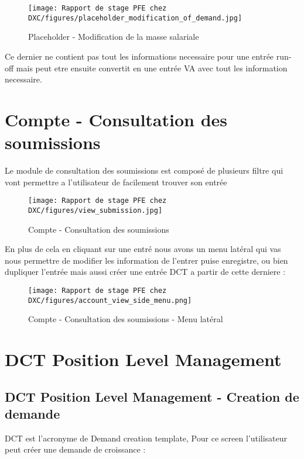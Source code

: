 \begin{figure}[H]
    \centering
    \texttt{[image: Rapport de stage PFE chez DXC/figures/placeholder\_modification\_of\_demand.jpg]}
    \caption{Placeholder - Modification de la masse salariale}
\end{figure}

Ce dernier ne contient pas tout les informations necessaire pour une entrée run-off mais peut etre ensuite convertit en une entrée VA avec tout les information necessaire.

\newpage
\section{Compte - Consultation des soumissions}

Le module de consultation des soumissions est composé de plusieurs filtre qui vont permettre a l'utilisateur de facilement trouver son entrée 

\begin{figure}[H]
    \centering
    \texttt{[image: Rapport de stage PFE chez DXC/figures/view\_submission.jpg]}
    \caption{Compte - Consultation des soumissions}
\end{figure}

En plus de cela en cliquant sur une entré nous avons un menu latéral qui vas nous permettre de modifier les information de l'entrer puise enregistre, ou bien 
dupliquer l'entrée mais aussi créer une entrée DCT a partir de cette derniere :

\begin{figure}[H]
    \centering
    \texttt{[image: Rapport de stage PFE chez DXC/figures/account\_view\_side\_menu.png]}
    \caption{Compte - Consultation des soumissions - Menu latéral}
\end{figure}

\section{DCT Position Level Management}

\subsection{DCT Position Level Management - Creation de demande}

DCT est l'acronyme de Demand creation template, Pour ce screen l'utilisateur peut créer une demande de croissance : 

